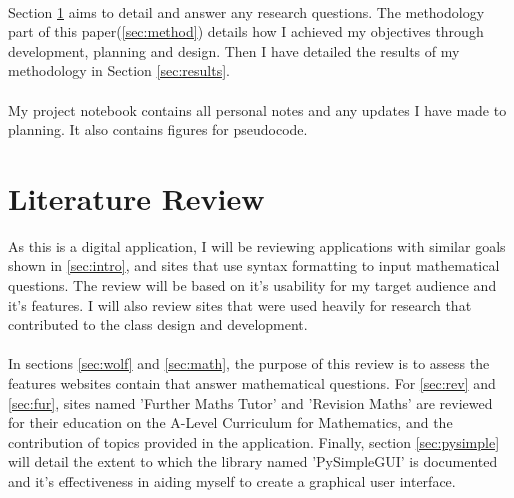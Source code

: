 \documentclass[final]{cmpreport}
\begin{document}
	\\Section \ref{sec:lit} aims to detail and answer any research questions. The methodology part of this paper(\ref{sec:method}) details how I achieved my objectives through development, planning and design. Then I have detailed the results of my methodology in Section \ref{sec:results}.\\
	\\My project notebook contains all personal notes and any updates I have made to planning. It also contains figures for pseudocode.
	

	\section{Literature Review} \label{sec:lit}
	
	As this is a digital application, I will be reviewing applications with similar goals shown in \ref{sec:intro}, and sites that use syntax formatting to input mathematical questions. The review will be based on it's usability for my target audience and it's features. I will also review sites that were used heavily for research that contributed to the class design and development.\\
	\\In sections \ref{sec:wolf} and \ref{sec:math}, the purpose of this review is to assess the features websites contain that answer mathematical questions. For \ref{sec:rev} and \ref{sec:fur}, sites named 'Further Maths Tutor' and 'Revision Maths' are reviewed for their education on the A-Level Curriculum for Mathematics, and the contribution of topics provided in the application. Finally, section \ref{sec:pysimple} will detail the extent to which the library named 'PySimpleGUI' is documented and it's effectiveness in aiding myself to create a graphical user interface.
	
\end{document}
